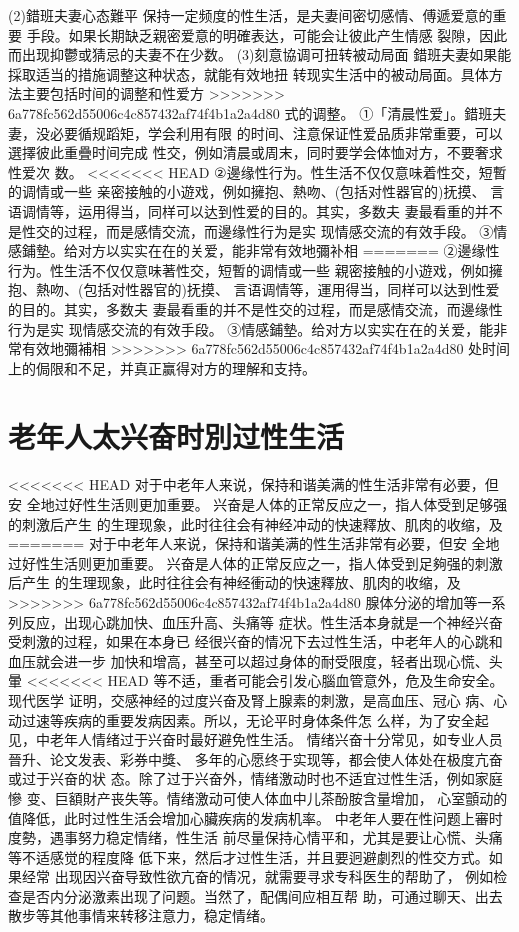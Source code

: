 \documentclass[12pt,UTF8]{ctexbook}
\begin{document}
(2)錯班夫妻心态難平
保持一定频度的性生活，是夫妻间密切感情、傅遞爱意的重要
手段。如果长期缺乏親密爱意的明確表达，可能会让彼此产生情感
裂隙，因此而出现抑鬱或猜忌的夫妻不在少数。
(3)刻意協调可扭转被动局面
錯班夫妻如果能採取适当的措施调整这种状态，就能有效地扭
转现实生活中的被动局面。具体方法主要包括时间的调整和性爱方
>>>>>>> 6a778fc562d55006c4c857432af74f4b1a2a4d80
式的调整。
①「清晨性爱」。錯班夫妻，没必要循规蹈矩，学会利用有限
的时间、注意保证性爱品质非常重要，可以選擇彼此重疊时间完成
性交，例如清晨或周末，同时要学会体恤对方，不要奢求性爱次
数。
<<<<<<< HEAD
②邊缘性行为。性生活不仅仅意味着性交，短暫的调情或一些
亲密接触的小遊戏，例如擁抱、熱吻、(包括对性器官的)抚摸、
言语调情等，运用得当，同样可以达到性爱的目的。其实，多数夫
妻最看重的并不是性交的过程，而是感情交流，而邊缘性行为是实
现情感交流的有效手段。
③情感鋪墊。给对方以实实在在的关爱，能非常有效地彌补相
=======
②邊缘性行为。性生活不仅仅意味著性交，短暫的调情或一些
親密接触的小遊戏，例如擁抱、熱吻、(包括对性器官的)抚摸、
言语调情等，運用得当，同样可以达到性爱的目的。其实，多数夫
妻最看重的并不是性交的过程，而是感情交流，而邊缘性行为是实
现情感交流的有效手段。
③情感鋪墊。给对方以实实在在的关爱，能非常有效地彌補相
>>>>>>> 6a778fc562d55006c4c857432af74f4b1a2a4d80
处时间上的侷限和不足，并真正赢得对方的理解和支持。


\section{老年人太兴奋时別过性生活}

<<<<<<< HEAD
对于中老年人来说，保持和谐美满的性生活非常有必要，但安
全地过好性生活则更加重要。
兴奋是人体的正常反应之一，指人体受到足够强的刺激后产生
的生理现象，此时往往会有神经冲动的快速釋放、肌肉的收缩，及
=======
对于中老年人来说，保持和谐美满的性生活非常有必要，但安
全地过好性生活则更加重要。
兴奋是人体的正常反应之一，指人体受到足夠强的刺激后产生
的生理现象，此时往往会有神经衝动的快速釋放、肌肉的收缩，及
>>>>>>> 6a778fc562d55006c4c857432af74f4b1a2a4d80
腺体分泌的增加等一系列反应，出现心跳加快、血压升高、头痛等
症状。性生活本身就是一个神经兴奋受刺激的过程，如果在本身已
经很兴奋的情况下去过性生活，中老年人的心跳和血压就会进一步
加快和增高，甚至可以超过身体的耐受限度，轻者出现心慌、头暈
<<<<<<< HEAD
等不适，重者可能会引发心腦血管意外，危及生命安全。现代医学
证明，交感神经的过度兴奋及腎上腺素的刺激，是高血压、冠心
病、心动过速等疾病的重要发病因素。所以，无论平时身体条件怎
么样，为了安全起见，中老年人情绪过于兴奋时最好避免性生活。
情绪兴奋十分常见，如专业人员晉升、论文发表、彩券中獎、
多年的心愿终于实现等，都会使人体处在极度亢奋或过于兴奋的状
态。除了过于兴奋外，情绪激动时也不适宜过性生活，例如家庭慘
变、巨額財产丧失等。情绪激动可使人体血中儿茶酚胺含量增加，
心室顫动的值降低，此时过性生活会增加心臟疾病的发病机率。
中老年人要在性问题上審时度勢，遇事努力稳定情绪，性生活
前尽量保持心情平和，尤其是要让心慌、头痛等不适感觉的程度降
低下来，然后才过性生活，并且要迥避劇烈的性交方式。如果经常
出现因兴奋导致性欲亢奋的情况，就需要寻求专科医生的帮助了，
例如检查是否内分泌激素出现了问题。当然了，配偶间应相互帮
助，可通过聊天、出去散步等其他事情来转移注意力，稳定情绪。
\end{document}
